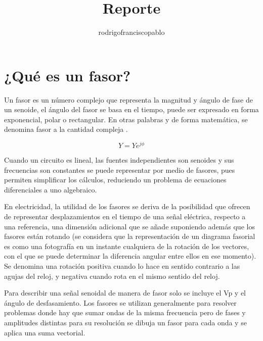 \documentclass{mylib/reporte}
\title{Reporte}
\author{rodrigofranciscopablo }
\begin{document}
\coverPage

\tableofcontents
\newpage

\section{¿Qué es un fasor?}

Un fasor es un número complejo que representa la magnitud y ángulo de fase de un senoide, el ángulo del fasor se basa en el tiempo, puede ser expresado en forma exponencial, polar o rectangular.
En otras palabras y de forma matemática, se denomina fasor a la cantidad compleja .

$$Y=Ye^{j\phi}$$

Cuando un circuito es lineal, las fuentes independientes son senoides y sus frecuencias son constantes se puede representar por medio de fasores, pues permiten simplificar los cálculos, reduciendo un problema de ecuaciones diferenciales a uno algebraico. 

En electricidad, la utilidad de los fasores se deriva de la posibilidad que ofrecen de representar desplazamientos en el tiempo de una señal eléctrica, respecto a una referencia, una dimensión adicional que se añade suponiendo además que los fasores están rotando (se considera que la representación de un diagrama fasorial es como una fotografía en un instante cualquiera de la rotación de los vectores, con el que se puede determinar la diferencia angular entre ellos en ese momento). Se denomina una rotación positiva cuando lo hace en sentido contrario a las agujas del reloj, y negativa cuando rota en el mismo sentido del reloj.

Para describir una señal senoidal de manera de fasor solo se incluye el Vp y el ángulo de desfasamiento.
Los fasores se utilizan generalmente para resolver problemas donde hay que sumar ondas de la misma frecuencia pero de fases y amplitudes distintas para su resolución se dibuja un fasor para cada onda y se aplica una suma vectorial.
\end{document}
